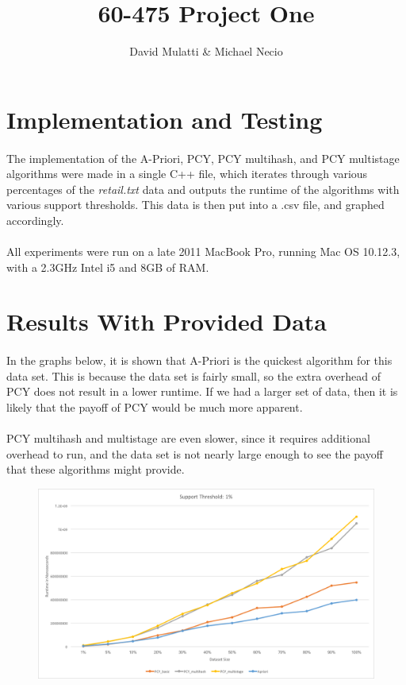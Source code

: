 \documentclass[11pt,letterpaper,titlepage]{article}
\title{60-475 Project One}
\author{David Mulatti \& Michael Necio}
\date{}
\begin{document}
	\maketitle
	\section{Implementation and Testing}
		\paragraph{}
			The implementation of the A-Priori, PCY, PCY multihash, and PCY
			multistage algorithms were made in a single C++ file, which iterates
			through various percentages of the \emph{retail.txt} data and
			outputs the runtime of the algorithms with various support
			thresholds. This data is then put into a .csv file, and graphed
			accordingly.

		\paragraph{}
			All experiments were run on a late 2011 MacBook Pro, running Mac OS
			10.12.3, with a 2.3GHz Intel i5 and 8GB of RAM.

	\section{Results With Provided Data}
		\paragraph{}
			In the graphs below, it is shown that A-Priori is the quickest
			algorithm for this data set. This is because the data set is fairly
			small, so the extra overhead of PCY does not result in a lower
			runtime. If we had a larger set of data, then it is likely that the
			payoff of PCY would be much more apparent.

		\paragraph{}
			PCY multihash and multistage are even slower, since it
			requires additional overhead to run, and the data set is not nearly
			large enough to see the payoff that these algorithms might provide.


		\begin{figure}[H]
			\includegraphics[width=\textwidth]{st1}
		\end{figure}
\end{document}
